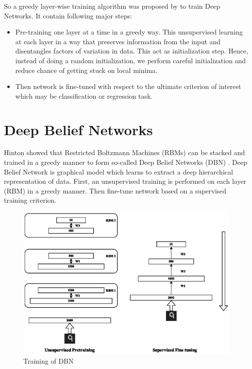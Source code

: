 So a greedy layer-wise training algorithm was proposed by \citet{hinton2006reducing} to train Deep Networks. It contain following major steps:
\begin{itemize}
\item Pre-training one layer at a time in a greedy way. This unsupervised learning at each layer in a way that preserves information from the input and disentangles factors of
variation in data. This act as initialization step. Hence, instead of doing a random initialization, we perform careful initialization and reduce chance of getting stuck on local minima.
\item Then network is fine-tuned with respect to the ultimate criterion of interest which may be classification or regression task.
\end{itemize}

\section{Deep Belief Networks}
Hinton showed that Restricted Boltzmann Machines (RBMs) can be stacked and trained in a greedy manner to form so-called Deep Belief Networks (DBN) \cite{hinton2006reducing}. Deep Belief Network is graphical model which learns to extract a deep hierarchical representation of data. First, an unsupervised training is performed on each layer (RBM) in a greedy manner. Then fine-tune network based on a supervised training criterion.
\begin{figure}[!ht]
\includegraphics[scale=1]{./imgs/RBM_Train.eps} 
\caption{Training of DBN}
\end{figure}

